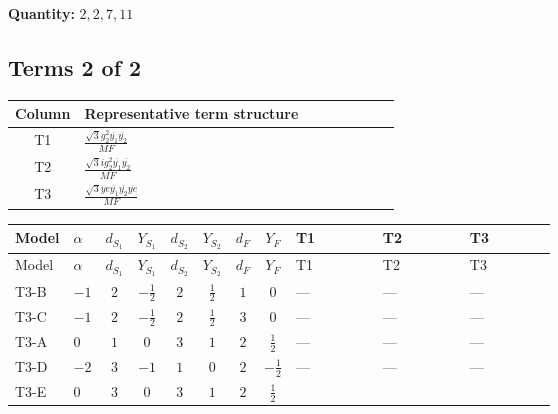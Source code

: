 \documentclass[8pt]{article}
\begin{document}
\begin{landscape}
\begin{longtable}{@{}llcccccc >{\raggedright\arraybackslash}p{0.21\linewidth} >{\raggedright\arraybackslash}p{0.21\linewidth} >{\raggedright\arraybackslash}p{0.21\linewidth}@{}}
\midrule
\bottomrule
\end{longtable}
\clearpage
\noindent\textbf{Quantity: }$\mathrm{2,2,7,11}$\par\smallskip
\subsection*{Terms 2 of 2}
\begin{center}
\begin{tabular}{@{}c >{\raggedright\arraybackslash}p{0.82\linewidth}@{}}
\toprule
Column & Representative term structure \\
\midrule
T1 & \(\displaystyle \frac{\sqrt{3} g_{2}^{2} \overline{y_{1}} \overline{y_{2}}}{MF}\) \\
\midrule
T2 & \(\displaystyle \frac{\sqrt{3} i g_{2}^{2} \overline{y_{1}} \overline{y_{2}}}{MF}\) \\
\midrule
T3 & \(\displaystyle \frac{\sqrt{3} ye \overline{y_{1}} \overline{y_{2}} \overline{ye}}{MF}\) \\
\midrule
\bottomrule
\end{tabular}
\end{center}
\smallskip
\tiny
\begin{longtable}{@{}llcccccc >{\raggedright\arraybackslash}p{0.21\linewidth} >{\raggedright\arraybackslash}p{0.21\linewidth} >{\raggedright\arraybackslash}p{0.21\linewidth}@{}}
\toprule
Model & $\alpha$ & $d_{S_1}$ & $Y_{S_1}$ & $d_{S_2}$ & $Y_{S_2}$ & $d_F$ & $Y_F$ & T1 & T2 & T3 \\
\midrule
\endfirsthead
\toprule
Model & $\alpha$ & $d_{S_1}$ & $Y_{S_1}$ & $d_{S_2}$ & $Y_{S_2}$ & $d_F$ & $Y_F$ & T1 & T2 & T3 \\
\midrule
\endhead
T3-B & $-1$ & $2$ & $-\frac{1}{2}$ & $2$ & $\frac{1}{2}$ & $1$ & $0$ & --- & --- & --- \\
\midrule
T3-C & $-1$ & $2$ & $-\frac{1}{2}$ & $2$ & $\frac{1}{2}$ & $3$ & $0$ & --- & --- & --- \\
\midrule
T3-A & $0$ & $1$ & $0$ & $3$ & $1$ & $2$ & $\frac{1}{2}$ & --- & --- & --- \\
\midrule
T3-D & $-2$ & $3$ & $-1$ & $1$ & $0$ & $2$ & $-\frac{1}{2}$ & --- & --- & --- \\
\midrule
T3-E & $0$ & $3$ & $0$ & $3$ & $1$ & $2$ & $\frac{1}{2}$ & \scriptsize\adjustbox{max width=\linewidth}{$\begin{gathered} \frac{11 \sqrt{3} g_{2}^{2} \overline{y_{1}} \overline{y_{2}}}{8 MF}\end{gathered}$} & \scriptsize\adjustbox{max width=\linewidth}{$\begin{gathered} - \frac{\sqrt{3} i g_{2}^{2} \overline{y_{1}} \overline{y_{2}}}{6 MF}\end{gathered}$} & \scriptsize\adjustbox{max width=\linewidth}{$\begin{gathered} - \frac{\sqrt{3} ye \overline{y_{1}} \overline{y_{2}} \overline{ye}}{12 MF}\end{gathered}$} \\
\midrule
\bottomrule
\end{longtable}
\clearpage

\end{landscape}
\end{document}
